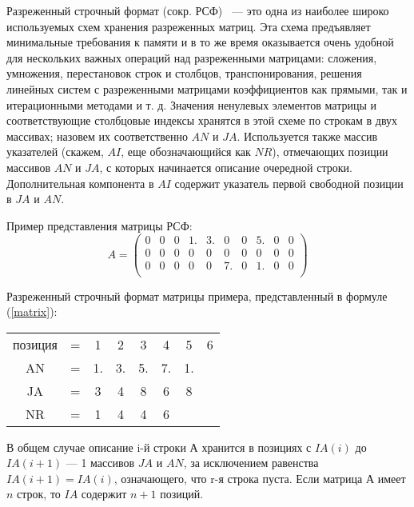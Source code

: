 Разреженный строчный формат (сокр. РСФ)~\cite{csr} --- это одна из наиболее широко используемых схем хранения разреженных матриц.
Эта схема предъявляет минимальные требования к памяти и в то же
время оказывается очень удобной для нескольких важных операций над разреженными матрицами: сложения, умножения,
перестановок строк и столбцов, транспонирования, решения линейных систем с разреженными матрицами коэффициентов как
прямыми, так и итерационными методами и т. д. 
Значения ненулевых элементов матрицы и соответствующие столбцовые индексы хранятся в этой схеме по строкам в двух массивах; назовем их соответственно $AN$ и $JA$. 
Используется также массив указателей (скажем, $AI$, еще обозначающийся как $NR$), отмечающих позиции массивов $AN$ и $JA$, с которых начинается описание очередной строки. Дополнительная компонента в $AI$ содержит указатель первой свободной позиции в $JA$ и $AN$. 

Пример представления матрицы РСФ:
\begin{equation}
	\label{matrix}
	A = \begin{pmatrix}
		0 & 0 & 0 & 1. & 3. & 0 & 0 & 5. & 0 & 0 \\
		0 & 0 & 0 & 0 & 0 & 0 & 0 & 0 & 0 & 0 \\
		0 & 0 & 0 & 0 & 0 & 7. & 0 & 1. & 0 & 0 \\						
	\end{pmatrix}
\end{equation}

Разреженный строчный формат матрицы примера, представленный в  формуле (\ref{matrix}):

\begin{table}[h!]
	\begin{center}
		\begin{tabular}{c c c c c c c c}
			позиция & = & 1 & 2 & 3 & 4 & 5 & 6 \\
			AN & = & 1. & 3. & 5. & 7. & 1. & \\
			JA & = & 3 & 4 & 8 & 6 & 8 & \\
			NR & = & 1 & 4 & 4 & 6 & & \\
		\end{tabular}
	\end{center}
\end{table}

\clearpage

В общем случае описание i-й строки $А$ хранится в позициях с $IA(i)$ до $IA(i + 1)$ --- 1 массивов $JA$ и $AN$, за исключением
равенства $IA(i + 1) = IA(i)$, означающего, что r-я строка пуста.
Если матрица $А$ имеет $n$ строк, то $IA$ содержит $n + 1$ позиций. 

